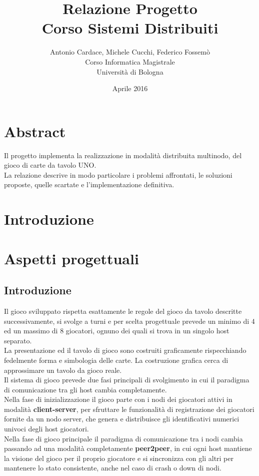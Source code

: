 \documentclass[10pt,a4paper]{article}
\begin{document}
\title{Relazione Progetto\\Corso Sistemi Distribuiti}
\author{Antonio Cardace, Michele Cucchi, Federico Fossemò\\Corso Informatica Magistrale\\Università di Bologna}
\date{Aprile 2016}
\maketitle

\section{Abstract}
Il progetto implementa la realizzazione in modalità distribuita multinodo, del gioco di carte da tavolo UNO. \\La relazione descrive in modo particolare i problemi affrontati, le soluzioni proposte, quelle scartate e l'implementazione definitiva.

\section{Introduzione}



\section{Aspetti progettuali}
\subsection{Introduzione}
Il gioco sviluppato rispetta esattamente le regole del gioco da tavolo descritte successivamente, si svolge a turni e per scelta progettuale prevede un minimo di 4 ed un massimo di 8 giocatori, ognuno dei quali si trova in un singolo host separato. \\La presentazione ed il tavolo di gioco sono costruiti graficamente rispecchiando fedelmente forma e simbologia delle carte. La costruzione grafica cerca di approssimare un tavolo da gioco reale.\\Il sistema di gioco prevede due fasi principali di svolgimento in cui il paradigma di comunicazione tra gli host cambia completamente. \\Nella fase di inizializzazione il gioco parte con i nodi dei giocatori attivi in modalità \textbf{client-server}, per sfruttare le funzionalità di registrazione dei giocatori fornite da un nodo server, che genera e distribuisce gli identificativi numerici univoci degli host giocatori. \\Nella fase di gioco principale il paradigma di comunicazione tra i nodi cambia passando ad una modalità completamente \textbf{peer2peer}, in cui ogni host mantiene la visione del gioco per il proprio giocatore e si sincronizza con gli altri per mantenere lo stato consistente, anche nel caso di crash o down di nodi.
\end{document}
